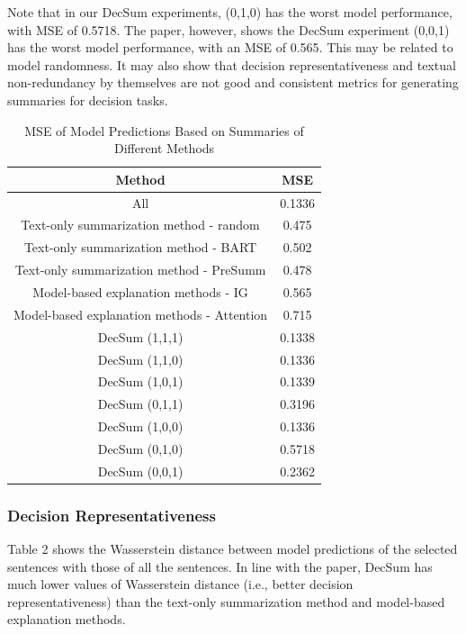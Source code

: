 \documentclass{article}
\begin{document}
Note that in our DecSum experiments, (0,1,0) has the worst model performance, with MSE of 0.5718. The paper, however, shows the DecSum experiment (0,0,1) has the worst model performance,
with an MSE of 0.565. This may be related to model randomness. It may also show that decision representativeness and textual non-redundancy by themselves are not good and consistent metrics for
generating summaries for decision tasks.

\begin{table}[ht]
    \centering
    \caption{MSE of Model Predictions Based on Summaries of Different Methods}
    \begin{tabular}{|c|c|}
        \hline \textbf{Method} & \textbf{MSE} \\
        \hline All & 0.1336 \\
        \hline Text-only summarization method - random & 0.475 \\
        \hline Text-only summarization method - BART & 0.502 \\
        \hline Text-only summarization method - PreSumm & 0.478 \\
        \hline Model-based explanation methods - IG & 0.565 \\
        \hline Model-based explanation methods - Attention & 0.715 \\
        \hline DecSum (1,1,1)   & 0.1338 \\
        \hline DecSum (1,1,0)   & 0.1336 \\
        \hline DecSum (1,0,1)   & 0.1339 \\
        \hline DecSum (0,1,1)   & 0.3196 \\
        \hline DecSum (1,0,0)   & 0.1336 \\
        \hline DecSum (0,1,0)   & 0.5718 \\
        \hline DecSum (0,0,1)   & 0.2362 \\ \hline
    \end{tabular}
\end{table}



\subsubsection{Decision Representativeness}
Table 2 shows the Wasserstein distance between model predictions of the selected sentences with those of all the sentences. In line with the paper, DecSum has much lower values of Wasserstein distance
(i.e., better decision representativeness) than the text-only summarization method and model-based explanation methods.
\end{document}
